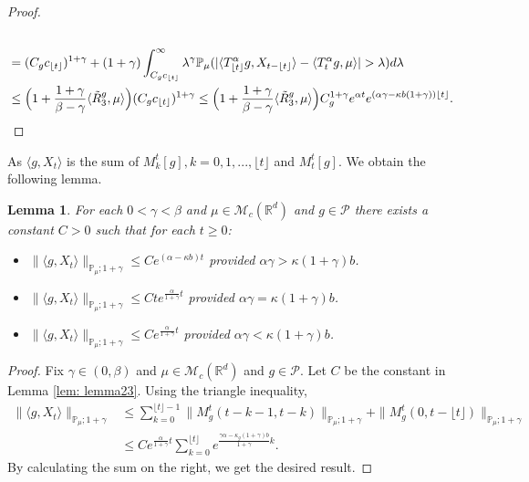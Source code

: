 \documentclass[12pt,oneside,english]{amsart}
\theoremstyle{plain}
\newtheorem{lem}[thm]{Lemma}
\theoremstyle{definition}
\numberwithin{equation}{section}
\newcommand{\added}[1]{{\color{blue}#1}}\newcommand{\deleted}[1]{{\color{red}#1}}
\begin{document}
{\begin{proof}
\begin{align}
     \\ & = (C_g c_{\lfloor t \rfloor})^{1+\gamma}+(1+\gamma)\int_{C_g c_{\lfloor t \rfloor}}^\infty \lambda^{\gamma}\mathbb P_\mu(|\langle T^{\alpha}_{\lfloor t \rfloor}g,X_{t-\lfloor t\rfloor}\rangle-\langle T^{\alpha}_t g, \mu\rangle|> \lambda) d\lambda
     \\ &\leq \Big(1+\frac{1+\gamma}{\beta-\gamma}\langle \tilde{R}^g_3, \mu\rangle\Big) (C_g c_{\lfloor t \rfloor})^{1+\gamma}\leq \Big(1+\frac{1+\gamma}{\beta-\gamma}\langle \tilde{R}^g_3, \mu\rangle\Big) C_g^{1+\gamma}e^{\alpha t}e^{(\alpha \gamma - \kappa b(1+\gamma))\lfloor t \rfloor}.
 \qedhere
\end{align}
\end{proof}
}
    As $\langle g,X_t\rangle$ is the sum of $M_k^{t}[g], k=0,1,...,\lfloor t\rfloor$ and $M_t^t[g]$. We obtain the following lemma.
\added{
\begin{lem}
\label{lemma24}
    For each $0 < \gamma < \beta$ and $\mu\in \mathcal M_c(\mathbb R^d)$ and $g\in \mathcal P$ there exists a constant $C>0$ such that for each $t\geq 0$:
\begin{itemize}
\item[(1)]
    $\|\langle g,X_t\rangle\|_{\mathbb{P}_{\mu};1+\gamma}\leq C e^{(\alpha-\kappa b)t}$ provided $\alpha\gamma > \kappa (1+\gamma)b$.
\item[(2)]
    $\|\langle g,X_t\rangle\|_{\mathbb{P}_{\mu};1+\gamma}\leq C te^{\frac{\alpha}{1+\gamma}t}$ provided $\alpha\gamma = \kappa (1+\gamma)b$.
\item[(3)]
    $\|\langle g,X_t\rangle\|_{\mathbb{P}_{\mu};1+\gamma}\leq C e^{\frac{\alpha}{1+\gamma}t}$ provided $\alpha\gamma < \kappa (1+\gamma)b$.
\end{itemize}
\end{lem}
\begin{proof}
    Fix $\gamma \in (0,\beta)$ and $\mu \in \mathcal M_c(\mathbb R^d)$ and $g\in \mathcal P$.
    Let $C$ be the constant in Lemma \ref{lem: lemma23}.
    Using the triangle inequality,
\begin{align}
    \|\langle g,X_t\rangle\|_{\mathbb P_\mu;1+\gamma}
    &\leq \sum_{k=0}^{\lfloor t\rfloor - 1}\| M_g^t(t-k-1,t-k)\|_{\mathbb P_\mu;1+\gamma}+\|M_g^t(0, t-\lfloor t \rfloor)\|_{\mathbb P_\mu;1+\gamma}
    \\ &\leq C e^{\frac{\alpha}{1+\gamma}t}\sum_{k=0}^{\lfloor t\rfloor} e^{\frac{\gamma\alpha-\kappa_g (1+\gamma)b}{1+\gamma} k} .
\end{align}
    By calculating the sum on the right, we get the desired result.
\end{proof}
}
\end{document}
